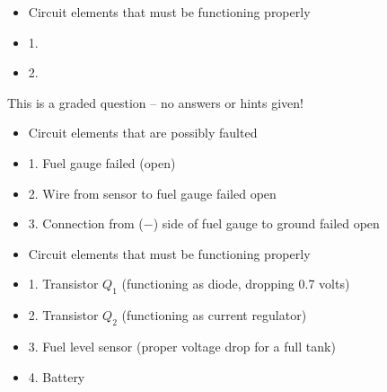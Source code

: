 \begin{itemize}
\goodbreak
\item{} Circuit elements that must be functioning properly
\item{1.} 
\item{2.} 
\end{itemize}

\vfil 

\eject






This is a graded question -- no answers or hints given!







\begin{itemize}
\item{} Circuit elements that are possibly faulted
\item{1.} Fuel gauge failed (open)
\item{2.} Wire from sensor to fuel gauge failed open
\item{3.} Connection from ($-$) side of fuel gauge to ground failed open
\end{itemize}

\begin{itemize}
\item{} Circuit elements that must be functioning properly
\item{1.} Transistor $Q_1$ (functioning as diode, dropping 0.7 volts)
\item{2.} Transistor $Q_2$ (functioning as current regulator)
\item{3.} Fuel level sensor (proper voltage drop for a full tank)
\item{4.} Battery
\end{itemize}




